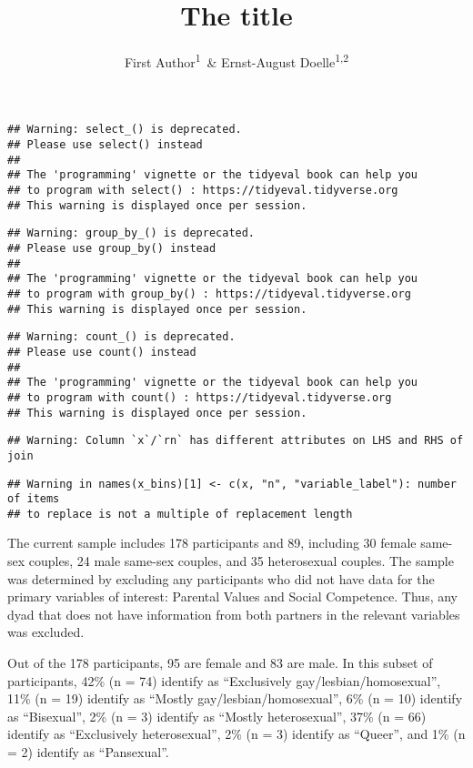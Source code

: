 \documentclass[man]{apa6}
\title{The title}
\author{First Author\textsuperscript{1}~\& Ernst-August Doelle\textsuperscript{1,2}}
\date{}
\affiliation{
\vspace{0.5cm}
\textsuperscript{1} Wilhelm-Wundt-University\\\textsuperscript{2} Konstanz Business School}
\begin{document}
\maketitle

\begin{verbatim}
## Warning: select_() is deprecated. 
## Please use select() instead
## 
## The 'programming' vignette or the tidyeval book can help you
## to program with select() : https://tidyeval.tidyverse.org
## This warning is displayed once per session.
\end{verbatim}

\begin{verbatim}
## Warning: group_by_() is deprecated. 
## Please use group_by() instead
## 
## The 'programming' vignette or the tidyeval book can help you
## to program with group_by() : https://tidyeval.tidyverse.org
## This warning is displayed once per session.
\end{verbatim}

\begin{verbatim}
## Warning: count_() is deprecated. 
## Please use count() instead
## 
## The 'programming' vignette or the tidyeval book can help you
## to program with count() : https://tidyeval.tidyverse.org
## This warning is displayed once per session.
\end{verbatim}

\begin{verbatim}
## Warning: Column `x`/`rn` has different attributes on LHS and RHS of join
\end{verbatim}

\begin{verbatim}
## Warning in names(x_bins)[1] <- c(x, "n", "variable_label"): number of items
## to replace is not a multiple of replacement length
\end{verbatim}

The current sample includes 178 participants and 89, including 30 female same-sex couples, 24 male same-sex couples, and 35 heterosexual couples. The sample was determined by excluding any participants who did not have data for the primary variables of interest: Parental Values and Social Competence. Thus, any dyad that does not have information from both partners in the relevant variables was excluded.

Out of the 178 participants, 95 are female and 83 are male. In this subset of participants,
42\% (n = 74) identify as \enquote{Exclusively gay/lesbian/homosexual},
11\% (n = 19) identify as \enquote{Mostly gay/lesbian/homosexual},
6\% (n = 10) identify as \enquote{Bisexual},
2\% (n = 3) identify as \enquote{Mostly heterosexual},
37\% (n = 66) identify as \enquote{Exclusively heterosexual},
2\% (n = 3) identify as \enquote{Queer}, and
1\% (n = 2) identify as \enquote{Pansexual}.
\end{document}
